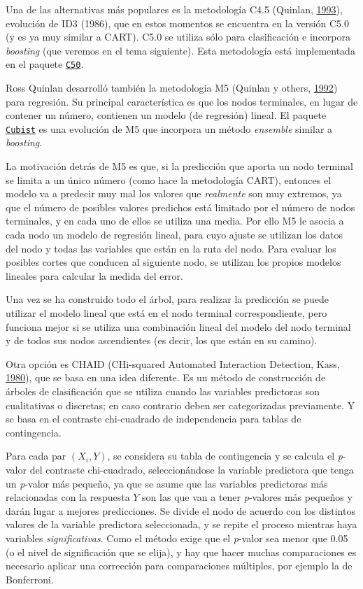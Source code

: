 \documentclass[
  spanish,
]{book}
\theoremstyle{break}
\theoremstyle{definition}
\theoremstyle{definition}
\theoremstyle{definition}
\theoremstyle{remark}
\begin{document}
Una de las alternativas más populares es la metodología C4.5 (Quinlan, \protect\hyperlink{ref-quinlan1993c4}{1993}), evolución de ID3 (1986), que en estos momentos se encuentra en la versión C5.0 (y es ya muy similar a CART).
C5.0 se utiliza sólo para clasificación e incorpora \emph{boosting} (que veremos en el tema siguiente).
Esta metodología está implementada en el paquete \href{https://topepo.github.io/C5.0/index.html}{\texttt{C50}}.

Ross Quinlan desarrolló también la metodologia M5 (Quinlan y others, \protect\hyperlink{ref-quinlan1992learning}{1992}) para regresión.
Su principal característica es que los nodos terminales, en lugar de contener un número, contienen un modelo (de regresión) lineal.
El paquete \href{https://topepo.github.io/Cubist}{\texttt{Cubist}} es una evolución de M5 que incorpora un método \emph{ensemble} similar a \emph{boosting}.

La motivación detrás de M5 es que, si la predicción que aporta un nodo terminal se limita a un único número (como hace la metodología CART), entonces el modelo va a predecir muy mal los valores que \emph{realmente} son muy extremos, ya que el número de posibles valores predichos está limitado por el número de nodos terminales, y en cada uno de ellos se utiliza una media.
Por ello M5 le asocia a cada nodo un modelo de regresión lineal, para cuyo ajuste se utilizan los datos del nodo y todas las variables que están en la ruta del nodo.
Para evaluar los posibles cortes que conducen al siguiente nodo, se utilizan los propios modelos lineales para calcular la medida del error.

Una vez se ha construido todo el árbol, para realizar la predicción se puede utilizar el modelo lineal que está en el nodo terminal correspondiente, pero funciona mejor si se utiliza una combinación lineal del modelo del nodo terminal y de todos sus nodos ascendientes (es decir, los que están en su camino).

Otra opción es CHAID (CHi-squared Automated Interaction Detection, Kass, \protect\hyperlink{ref-kass1980exploratory}{1980}), que se basa en una idea diferente. Es un método de construcción de árboles de clasificación que se utiliza cuando las variables predictoras son cualitativas o discretas; en caso contrario deben ser categorizadas previamente.
Y se basa en el contraste chi-cuadrado de independencia para tablas de contingencia.

Para cada par \((X_i, Y)\), se considera su tabla de contingencia y se calcula el \emph{p}-valor del contraste chi-cuadrado, seleccionándose la variable predictora que tenga un \emph{p}-valor más pequeño, ya que se asume que las variables predictoras más relacionadas con la respuesta \(Y\) son las que van a tener \emph{p}-valores más pequeños y darán lugar a mejores predicciones.
Se divide el nodo de acuerdo con los distintos valores de la variable predictora seleccionada, y se repite el proceso mientras haya variables \emph{significativas}.
Como el método exige que el \emph{p}-valor sea menor que 0.05 (o el nivel de significación que se elija), y hay que hacer muchas comparaciones es necesario aplicar una corrección para comparaciones múltiples, por ejemplo la de Bonferroni.
\end{document}

